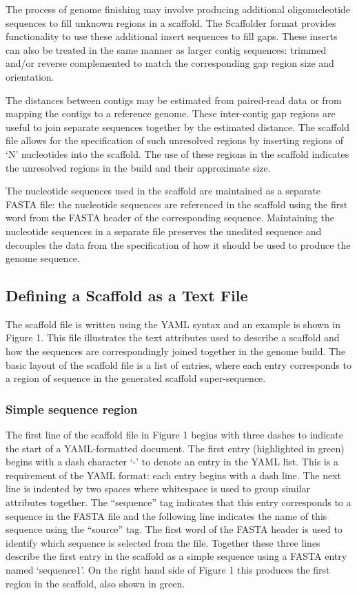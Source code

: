 \documentclass[10pt]{bmc_article}
\newenvironment{bmcformat}{\begin{raggedright}\baselineskip20pt\sloppy\setboolean{publ}{false}}{\end{raggedright}\baselineskip20pt\sloppy}
\begin{document}
\begin{bmcformat}
The process of genome finishing may involve producing additional
oligonucleotide sequences to fill unknown regions in a scaffold. The Scaffolder
format provides functionality to use these additional insert sequences to fill
gaps. These inserts can also be treated in the same manner as larger contig
sequences: trimmed and/or reverse complemented to match the corresponding gap
region size and orientation. \pb

The distances between contigs may be estimated from paired-read data or from
mapping the contigs to a reference genome. These inter-contig gap regions are
useful to join separate sequences together by the estimated distance. The
scaffold file allows for the specification of such unresolved regions by
inserting regions of `N' nucleotides into the scaffold. The use of these
regions in the scaffold indicates the unresolved regions in the build and their
approximate size. \pb

The nucleotide sequences used in the scaffold are maintained as a separate
FASTA file: the nucleotide sequences are referenced in the scaffold using the
first word from the FASTA header of the corresponding sequence. Maintaining the
nucleotide sequences in a separate file preserves the unedited sequence and
decouples the data from the specification of how it should be used to produce
the genome sequence. \pb

\subsection*{Defining a Scaffold as a Text File} %

The scaffold file is written using the YAML syntax and an example is shown in
Figure 1. This file illustrates the text attributes used to describe a scaffold
and how the sequences are correspondingly joined together in the genome build.
The basic layout of the scaffold file is a list of entries, where each entry
corresponds to a region of sequence in the generated scaffold super-sequence.
\pb

\subsubsection*{Simple sequence region} %

The first line of the scaffold file in Figure 1 begins with three dashes to
indicate the start of a YAML-formatted document. The first entry (highlighted
in green) begins with a dash character `-' to denote an entry in the YAML list.
This is a requirement of the YAML format: each entry begins with a dash line.
The next line is indented by two spaces where whitespace is used to group
similar attributes together. The ``sequence'' tag indicates that this entry
corresponds to a sequence in the FASTA file and the following line indicates
the name of this sequence using the ``source'' tag. The first word of the FASTA
header is used to identify which sequence is selected from the file. Together
these three lines describe the first entry in the scaffold as a simple sequence
using a FASTA entry named `sequence1'. On the right hand side of Figure 1 this
produces the first region in the scaffold, also shown in green. \pb


\end{bmcformat}
\end{document}
